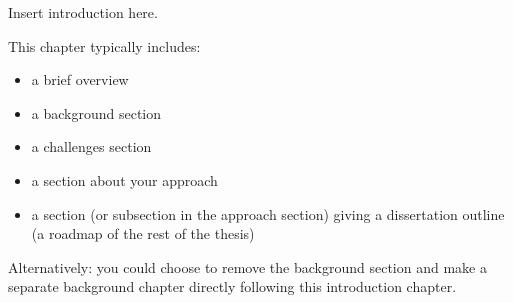 
{\color{orange} Insert introduction here.}

This chapter typically includes: 
\begin{itemize}
    \item a brief overview
    \item a background section
    \item a challenges section
    \item a section about your approach
    \item a section (or subsection in the approach section) giving a dissertation outline (a roadmap of the rest of the thesis)
\end{itemize}
Alternatively: you could choose to remove the background section and make a separate background chapter directly following this introduction chapter.
